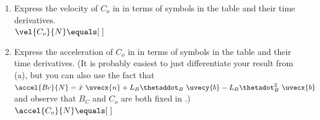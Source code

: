 \begin{enumerate}
\item Express the velocity of $C_o$ in  in terms of symbols in the table
and their time derivatives.
\\[0.5pc] $\vel{C_o}{N} \equals[\;]$
\\[11.0pc]
\item Express the acceleration of $C_o$ in  in terms of symbols in the table
and their time derivatives.
(It is probably easiest to just differentiate your result from (a),
but you can also use the fact that $\accel{Bc}{N} = \ddot{x}~\uvecx{n} + L_B \thetaddot_B ~\uvecy{b} - L_B \thetadot_B^2 ~\uvecx{b}$ and observe that $B_C$ and $C_o$ are both fixed in .)
\\[0.5pc] $\accel{C_o}{N} \equals[\;]$
\\[11.0pc]
\end{enumerate}
